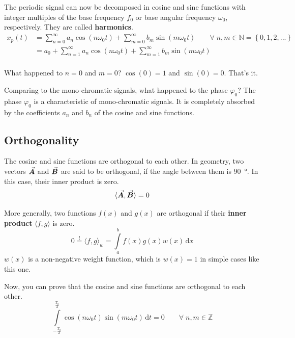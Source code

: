 \begin{refsection}
The periodic signal can now be decomposed in cosine and sine functions with integer multiples of the base frequency $f_0$ or base angular frequency $\omega_0$, respectively. They are called  \textbf{harmonics}.
\begin{equation}
	\begin{split}
		x_p(t) &= \sum\limits_{n=0}^{\infty} a_n \cos\left(n \omega_0 t\right) + \sum\limits_{m=0}^{\infty} b_m \sin\left(m \omega_0 t\right) \qquad \forall \; n, m \in \mathbb{N} = \left\{0, 1, 2, ...\right\} \\
		 &= a_0 + \sum\limits_{n=1}^{\infty} a_n \cos\left(n \omega_0 t\right) + \sum\limits_{m=1}^{\infty} b_m \sin\left(m \omega_0 t\right) \\
	\end{split}
	\label{eq:ch02:fourier_series}
\end{equation}

What happened to $n = 0$ and $m = 0$? $\cos(0) = 1$ and $\sin(0) = 0$. That's it.

Comparing to the mono-chromatic signals, what happened to the phase $\varphi_0$? The phase $\varphi_0$ is a characteristic of mono-chromatic signals. It is completely absorbed by the coefficients $a_n$ and $b_n$ of the cosine and sine functions.

\subsection{Orthogonality}
The cosine and sine functions are orthogonal to each other. In geometry, two vectors $\vec{\bm{A}}$ and $\vec{\bm{B}}$ are said to be orthogonal, if the angle between them is \SI{90}{\degree}. In this case, their inner product is zero.
\begin{equation}
	\langle \vec{\bm{A}}, \vec{\bm{B}} \rangle = 0
\end{equation}

More generally, two functions $f(x)$ and $g(x)$ are orthogonal if their  \textbf{inner product} $\langle f, g \rangle$ is zero. 
\begin{equation}
	0 \stackrel{!}{=} \langle f, g \rangle_w = \int\limits_{a}^{b} f(x) g(x) w(x) \, \mathrm{d} x
\end{equation}
$w(x)$ is a non-negative weight function, which is $w(x) = 1$ in simple cases like this one.

Now, you can prove that the cosine and sine functions are orthogonal to each other.
\begin{equation}
	\int\limits_{-\frac{T_0}{2}}^{\frac{T_0}{2}} \cos\left(n \omega_0 t\right) \sin\left(m \omega_0 t\right) \, \mathrm{d} t = 0 \qquad \forall \; n, m \in \mathbb{Z}
	\label{eq:ch02:orth_rel_cos_sin}
\end{equation}


\end{refsection}

